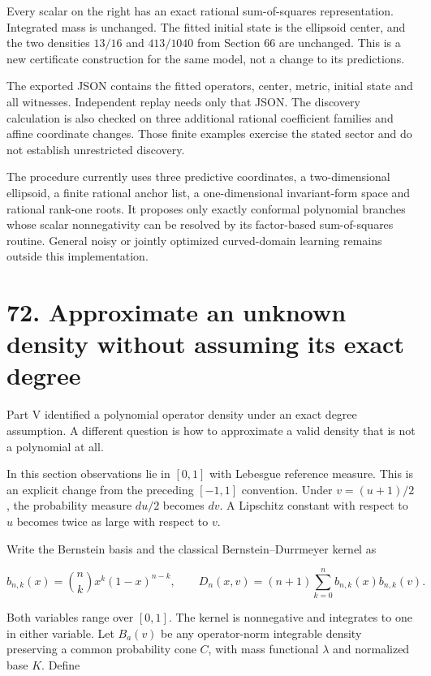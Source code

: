 \documentclass[11pt,letterpaper]{article}
\begin{document}
Every scalar on the right has an exact rational sum-of-squares
representation. Integrated mass is unchanged. The fitted initial state
is the ellipsoid center, and the two densities \(13/16\) and
\(413/1040\) from Section 66 are unchanged. This is a new certificate
construction for the same model, not a change to its predictions.

The exported JSON contains the fitted operators, center, metric, initial
state and all witnesses. Independent replay needs only that JSON. The
discovery calculation is also checked on three additional rational
coefficient families and affine coordinate changes. Those finite
examples exercise the stated sector and do not establish unrestricted
discovery.

The procedure currently uses three predictive coordinates, a
two-dimensional ellipsoid, a finite rational anchor list, a
one-dimensional invariant-form space and rational rank-one roots. It
proposes only exactly conformal polynomial branches whose scalar
nonnegativity can be resolved by its factor-based sum-of-squares
routine. General noisy or jointly optimized curved-domain learning
remains outside this implementation.

\section{72. Approximate an unknown density without assuming its exact
degree}\label{approximate-an-unknown-density-without-assuming-its-exact-degree}

Part V identified a polynomial operator density under an exact degree
assumption. A different question is how to approximate a valid density
that is not a polynomial at all.

In this section observations lie in \([0,1]\) with Lebesgue reference
measure. This is an explicit change from the preceding \([-1,1]\)
convention. Under \(v=(u+1)/2\), the probability measure \(du/2\)
becomes \(dv\). A Lipschitz constant with respect to \(u\) becomes twice
as large with respect to \(v\).

Write the Bernstein basis and the classical Bernstein--Durrmeyer kernel
as

\[
b_{n,k}(x)=\binom nk x^k(1-x)^{n-k},\qquad
D_n(x,v)=(n+1)\sum_{k=0}^n b_{n,k}(x)b_{n,k}(v).
\]

Both variables range over \([0,1]\). The kernel is nonnegative and
integrates to one in either variable. Let \(B_a(v)\) be any
operator-norm integrable density preserving a common probability cone
\(C\), with mass functional \(\lambda\) and normalized base \(K\).
Define
\end{document}
